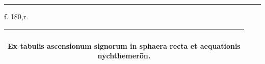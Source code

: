 \documentclass[11pt]{article}
\renewcommand{\arraystretch}{1.18}
\begin{document}
\clearpage
\noindent{}
\par\vspace{-1mm}\noindent\rule{\textwidth}{.4pt}\par\vspace{1mm}
\begin{center}{\small f. 180,r.}\end{center}\vspace{-3mm}
\begin{center}\setlength{\tabcolsep}{3pt}\renewcommand{\arraystretch}{1.02}\begin{tabular}{||c|>{\centering\arraybackslash}p{27mm}|>{\centering\arraybackslash}p{25mm}||>{\centering\arraybackslash}p{27mm}|>{\centering\arraybackslash}p{25mm}||>{\centering\arraybackslash}p{27mm}|>{\centering\arraybackslash}p{25mm}||}\hline
\multicolumn{7}{||c||}{\parbox{170mm}{\centering{}\\\textbf{Ex tabulis ascensionum signorum in sphaera recta et aequationis}\\\textbf{nychthemerōn.}\vspace{1mm}}} \\ \hline

\end{tabular}
\end{center}
\end{document}
